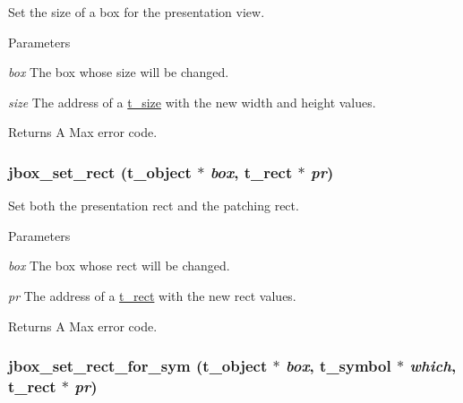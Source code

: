 Set the size of a box for the presentation view. 
\begin{DoxyParams}{Parameters}
\item[{\em box}]The box whose size will be changed. \item[{\em size}]The address of a \hyperlink{structt__size}{t\_\-size} with the new width and height values. \end{DoxyParams}
\begin{DoxyReturn}{Returns}
A Max error code. 
\end{DoxyReturn}
\hypertarget{group__jbox_gad342cd402e9dade9bb13b813a13f038c}{
\subsubsection[{jbox\_\-set\_\-rect}]{ jbox\_\-set\_\-rect ({\bf t\_\-object} $\ast$ {\em box}, \/  {\bf t\_\-rect} $\ast$ {\em pr})}}
\label{group__jbox_gad342cd402e9dade9bb13b813a13f038c}


Set both the presentation rect and the patching rect. 
\begin{DoxyParams}{Parameters}
\item[{\em box}]The box whose rect will be changed. \item[{\em pr}]The address of a \hyperlink{structt__rect}{t\_\-rect} with the new rect values. \end{DoxyParams}
\begin{DoxyReturn}{Returns}
A Max error code. 
\end{DoxyReturn}
\hypertarget{group__jbox_ga780de0c06bc1630cd0725174b21357f6}{
\subsubsection[{jbox\_\-set\_\-rect\_\-for\_\-sym}]{ jbox\_\-set\_\-rect\_\-for\_\-sym ({\bf t\_\-object} $\ast$ {\em box}, \/  {\bf t\_\-symbol} $\ast$ {\em which}, \/  {\bf t\_\-rect} $\ast$ {\em pr})}}
\label{group__jbox_ga780de0c06bc1630cd0725174b21357f6}


